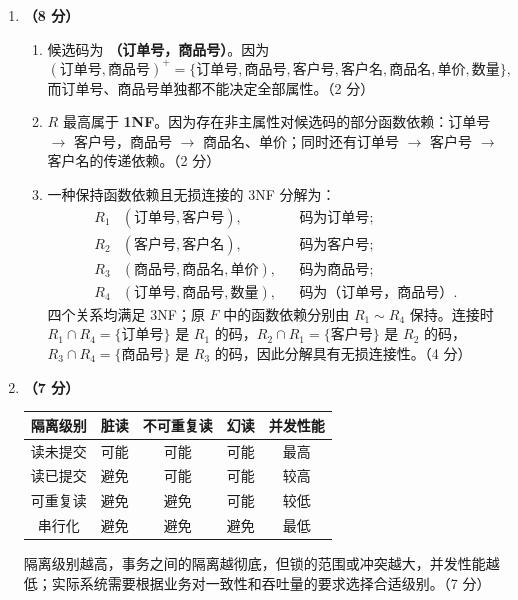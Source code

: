 \documentclass[a4paper,11pt]{article}
\begin{document}
\begin{enumerate}[start=21, label=\textbf{\arabic*.}, leftmargin=2.4em, itemsep=0.45em]
\item \textbf{（8 分）}
\begin{enumerate}[label=（\arabic*）, leftmargin=2.2em, itemsep=2pt]
  \item 候选码为 \textbf{（订单号，商品号）}。因为
  \[
  (\text{订单号},\text{商品号})^{+}
  =\{\text{订单号},\text{商品号},\text{客户号},\text{客户名},\text{商品名},\text{单价},\text{数量}\},
  \]
  而订单号、商品号单独都不能决定全部属性。\hfill（2 分）

  \item $R$ 最高属于 \textbf{1NF}。因为存在非主属性对候选码的部分函数依赖：订单号 $\to$ 客户号，商品号 $\to$ 商品名、单价；同时还有订单号 $\to$ 客户号 $\to$ 客户名的传递依赖。\hfill（2 分）

  \item 一种保持函数依赖且无损连接的 3NF 分解为：
  \[
  \begin{aligned}
  R_1&(\text{订单号},\text{客户号}), &&\text{码为订单号};\\
  R_2&(\text{客户号},\text{客户名}), &&\text{码为客户号};\\
  R_3&(\text{商品号},\text{商品名},\text{单价}), &&\text{码为商品号};\\
  R_4&(\text{订单号},\text{商品号},\text{数量}), &&\text{码为（订单号，商品号）}.
  \end{aligned}
  \]
  四个关系均满足 3NF；原 $F$ 中的函数依赖分别由 $R_1\sim R_4$ 保持。连接时 $R_1\cap R_4=\{\text{订单号}\}$ 是 $R_1$ 的码，$R_2\cap R_1=\{\text{客户号}\}$ 是 $R_2$ 的码，$R_3\cap R_4=\{\text{商品号}\}$ 是 $R_3$ 的码，因此分解具有无损连接性。\hfill（4 分）
\end{enumerate}

\item \textbf{（7 分）}
\begin{center}\small
\begin{tabular}{ccccc}
\toprule
隔离级别 & 脏读 & 不可重复读 & 幻读 & 并发性能 \\
\midrule
读未提交 & 可能 & 可能 & 可能 & 最高 \\
读已提交 & 避免 & 可能 & 可能 & 较高 \\
可重复读 & 避免 & 避免 & 可能 & 较低 \\
串行化 & 避免 & 避免 & 避免 & 最低 \\
\bottomrule
\end{tabular}
\end{center}
隔离级别越高，事务之间的隔离越彻底，但锁的范围或冲突越大，并发性能越低；实际系统需要根据业务对一致性和吞吐量的要求选择合适级别。\hfill（7 分）

\end{enumerate}
\end{document}
